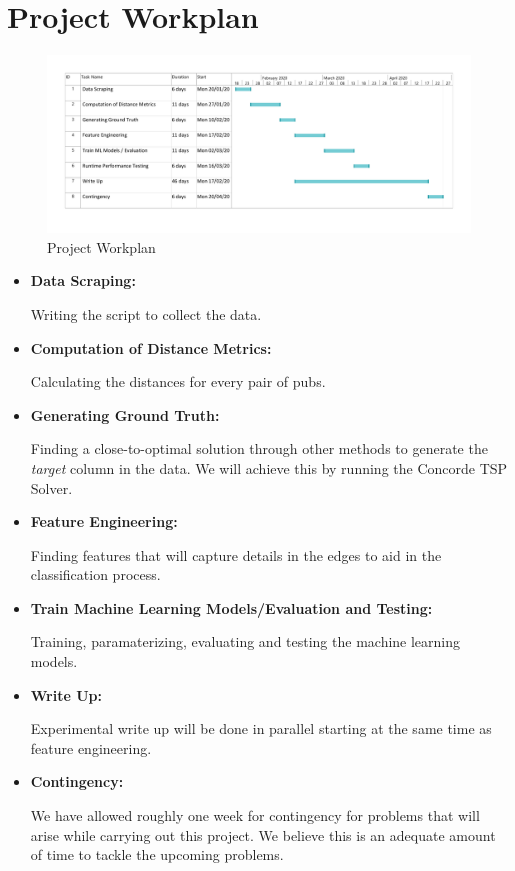 \documentclass[]{UCD_CS_FYP_Report}
\begin{document}
\chapter{Project Workplan}
\begin{figure}[h]
    \centering
  \includegraphics[width=1\linewidth]{Figures/GanttChart.pdf}
  \caption{Project Workplan}
  \label{fig:Workplan}
\end{figure}

\begin{itemize}
    \item \textbf{Data Scraping: }
    
    Writing the script to collect the data.
    \item \textbf{Computation of Distance Metrics: }
    
    Calculating the distances for every pair of pubs.
    \item \textbf{Generating Ground Truth: }
    
    Finding a close-to-optimal solution through other methods to generate the \textit{target} column in the data. We will achieve this by running the Concorde TSP Solver.
    \item \textbf{Feature Engineering: }
    
    Finding features that will capture details in the edges to aid in the classification process.
    \item \textbf{Train Machine Learning Models/Evaluation and Testing: }
    
    Training, paramaterizing, evaluating and testing the machine learning models.
    \item \textbf{Write Up: }
    
    Experimental write up will be done in parallel starting at the same time as feature engineering.
    \item \textbf{Contingency: }
    
    We have allowed roughly one week for contingency for problems that will arise while carrying out this project. We believe this is an adequate amount of time to tackle the upcoming problems.
\end{itemize}
\end{document}
